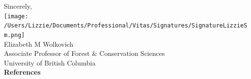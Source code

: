 \documentclass[11pt]{article}
\begin{document}

Sincerely,\\

\texttt{[image: /Users/Lizzie/Documents/Professional/Vitas/Signatures/SignatureLizzieSm.png]} \\

Elizabeth M Wolkovich\\
Associate Professor of Forest \& Conservation Sciences\\ 
University of British Columbia\\

{\bf References}
\vspace{-8ex}

\end{document}
